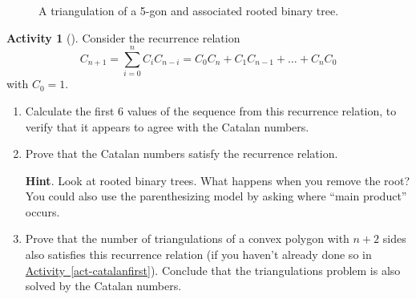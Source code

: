 \documentclass[10pt,]{book}
\theoremstyle{plain}
\theoremstyle{definition}
\theoremstyle{definition}
\theoremstyle{definition}
\newtheorem{activity}[project]{Activity}
\numberwithin{equation}{chapter}
\def\fivegon{%
    \coordinate (a) at (0,2.5);
    \coordinate (b) at (2,1.4);
    \coordinate (c) at (1,0);
    \coordinate (d) at (-.5,0);
    \coordinate (e) at (-2,1.5);
    \draw (a) -- (b) -- (c) -- (d) -- (e) -- (a);
  }
\newcommand{\vtx}[2]{node[fill,circle,inner sep=0pt, minimum size=4pt,label=#1:#2]{}}
\newcommand{\va}[1]{\vtx{above}{#1}}
\newcommand{\vr}[1]{\vtx{right}{#1}}
\newcommand{\vl}[1]{\vtx{left}{#1}}
\renewcommand{\v}{\vtx{above}{}}
\begin{document}
\begin{figure}
\centering
\begin{sidebyside}{2}{0.125}{0.125}{0.25}
\begin{sbspanel}{0.25}
\end{sbspanel}
\begin{sbspanel}{0.25}
\end{sbspanel}
\end{sidebyside}
\caption{A triangulation of a 5-gon and associated rooted binary tree.\label{fig-triangulationtree}}
\end{figure}
\begin{activity}[]\label{activity-174}
\hypertarget{p-1022}{}%
Consider the recurrence relation%
\begin{equation*}
C_{n + 1} = \sum_{i = 0}^n C_iC_{n-i} = C_{0}C_{n} + C_{1}C_{n - 1} + \ldots + C_{n}C_{0}
\end{equation*}
with \(C_0 = 1\).%
\begin{enumerate}[font=\bfseries,label=(\alph*),ref=\alph*]
\item\label{task-189} \hypertarget{p-1023}{}%
Calculate the first 6 values of the sequence from this recurrence relation, to verify that it appears to agree with the Catalan numbers.%
\item\label{task-190} \hypertarget{p-1024}{}%
Prove that the Catalan numbers satisfy the recurrence relation.%
\par\smallskip%
\noindent\textbf{Hint}.\hypertarget{hint-121}{}\quad%
\hypertarget{p-1025}{}%
Look at rooted binary trees.  What happens when you remove the root?  You could also use the parenthesizing model by asking where ``main product'' occurs.%
\item\label{task-191} \hypertarget{p-1026}{}%
Prove that the number of triangulations of a convex polygon with \(n+2\) sides also satisfies this recurrence relation (if you haven't already done so in \hyperref[act-catalanfirst]{Activity~\ref{act-catalanfirst}}).  Conclude that the triangulations problem is also solved by the Catalan numbers.%
\end{enumerate}
\end{activity}
\end{document}
